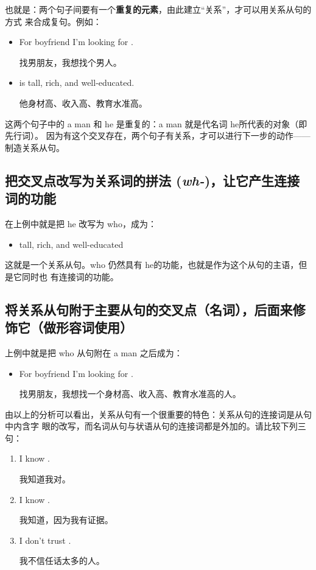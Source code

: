 也就是：两个句子间要有一个\textbf{重复的元素}，由此建立“关系”，才可以用关系从句的方式
来合成复句。例如：

\begin{itemize}
\item For boyfriend I'm looking for .

  找男朋友，我想找个男人。
\item {} is tall, rich, and well-educated.

  他身材高、收入高、教育水准高。
\end{itemize}
这两个句子中的 a man 和 he 是重复的：a man 就是代名词 he所代表的对象（即先行词）。
因为有这个交叉存在，两个句子有关系，才可以进行下一步的动作——制造关系从句。

\subsection{把交叉点改写为关系词的拼法 (\emph{wh-})，让它产生连接词的功能}

在上例中就是把 he 改写为 who，成为：
\begin{itemize}
\item {}  tall, rich, and well-educated
\end{itemize}
这就是一个关系从句。who 仍然具有 he的功能，也就是作为这个从句的主语，但是它同时也
有连接词的功能。

\subsection{将关系从句附于主要从句的交叉点（名词），后面来修饰它（做形容词使用）}

上例中就是把 who 从句附在 a man 之后成为：
\begin{itemize}
\item For boyfriend I'm looking for  .

  找男朋友，我想找一个身材高、收入高、教育水准高的人。
\end{itemize}

由以上的分析可以看出，关系从句有一个很重要的特色：关系从句的连接词是从句中内含字
眼的改写，而名词从句与状语从句的连接词都是外加的。请比较下列三句：

\begin{enumerate}
\item I know .

  我知道我对。
\item I know   .

  我知道，因为我有证据。
\item I don't trust  .

  我不信任话太多的人。
\end{enumerate}

